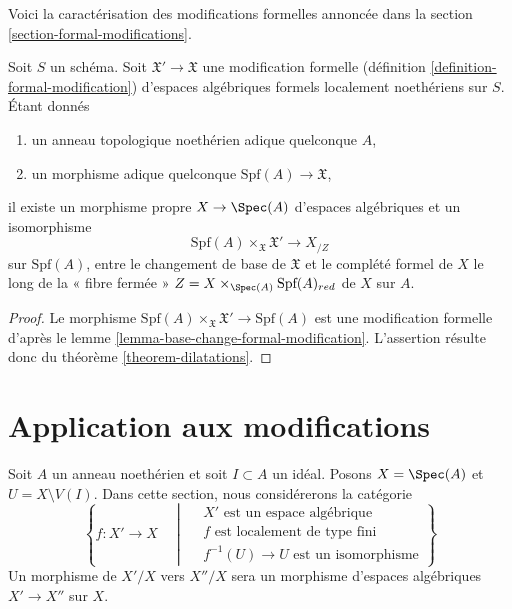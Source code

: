 \noindent
Voici la caractérisation des modifications formelles
annoncée dans la section \ref{section-formal-modifications}.

\begin{lemma}
\label{lemma-formal-modifications-locally-algebraic}
Soit $S$ un schéma. Soit $\mathfrak X' \to \mathfrak X$
une modification formelle (définition \ref{definition-formal-modification})
d'espaces algébriques formels localement noethériens sur $S$. Étant donnés
\begin{enumerate}
\item un anneau topologique noethérien adique quelconque $A$,
\item un morphisme adique quelconque $\text{Spf}(A) \longrightarrow \mathfrak X$,
\end{enumerate}
il existe un morphisme propre $X \to \Spec(A)$ d'espaces algébriques
et un isomorphisme
$$
\text{Spf}(A) \times_{\mathfrak X} \mathfrak X'
\longrightarrow
X_{/Z}
$$
sur $\text{Spf}(A)$, entre le changement de base de $\mathfrak X$
et le complété formel de $X$ le long de la « fibre fermée »
$Z = X \times_{\Spec(A)} \text{Spf}(A)_{red}$ de $X$ sur $A$.
\end{lemma}

\begin{proof}
Le morphisme $\text{Spf}(A) \times_{\mathfrak X} \mathfrak X'
\to \text{Spf}(A)$ est une modification formelle d'après le
lemme \ref{lemma-base-change-formal-modification}.
L'assertion résulte donc du théorème \ref{theorem-dilatations}.
\end{proof}







\section{Application aux modifications}
\label{section-modifications}

\noindent
Soit $A$ un anneau noethérien et soit $I \subset A$ un idéal. Posons
$X = \Spec(A)$ et $U = X \setminus V(I)$. Dans cette section,
nous considérerons la catégorie
\begin{equation}
\label{equation-modification}
\left\{
f : X' \longrightarrow X
\quad \middle| \quad
\begin{matrix}
X'\text{ est un espace algébrique}\\
f\text{ est localement de type fini}\\
f^{-1}(U) \to U\text{ est un isomorphisme}
\end{matrix}
\right\}
\end{equation}
Un morphisme de $X'/X$ vers $X''/X$ sera un morphisme d'espaces algébriques
$X' \to X''$ sur $X$.

